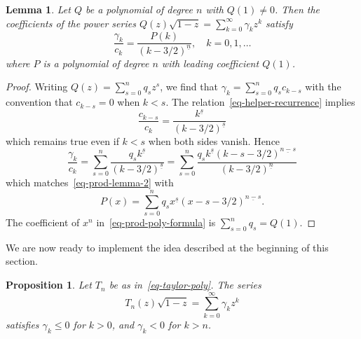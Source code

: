 \documentclass[12pt]{amsart}
\newtheorem{lemma}[theorem]{Lemma}
\newtheorem{proposition}[theorem]{Proposition}
\theoremstyle{definition}
\theoremstyle{remark}
\numberwithin{equation}{section}
\begin{document}
\begin{lemma}\label{lemma-prod-poly} Let $Q$ be a polynomial of degree $n$ with $Q(1)\ne 0$. Then the coefficients of the power series  
$Q(z) \sqrt{1-z} = \sum_{k=0}^\infty \gamma_k z^k$ 
satisfy     
\begin{equation}\label{eq-prod-lemma-2}
\frac{\gamma_k}{c_k} = 
\frac{P(k)}{(k-3/2)^{\underline{n}}},\quad k=0,1,\dots
\end{equation}    
where $P$ is a polynomial of degree $n$ with leading coefficient $Q(1)$. 
\end{lemma}


\begin{proof} Writing $Q(z)=\sum_{s=0}^n q_s z^s$, we find that 
$\gamma_k = \sum_{s=0}^n q_s c_{k-s}$ with the convention that $c_{k-s}=0$ when $k<s$. The relation~\eqref{eq-helper-recurrence} implies 
\[
\frac{c_{k-s}}{c_k} = \frac{k^{\underline{s}}}{(k-3/2)^{\underline{s}}}
\]
which remains true even if $k<s$ when both sides vanish. Hence
\[
\frac{\gamma_k}{c_k} = \sum_{s=0}^n  \frac{q_s k^{\underline{s}}}{(k-3/2)^{\underline{s}}} = 
 \sum_{s=0}^n \frac{ q_s  k^{\underline{s}}(k-s-3/2)^{\underline{n-s}} }{(k-3/2)^{\underline{n}}}
\]
which matches~\eqref{eq-prod-lemma-2} with 
\begin{equation}\label{eq-prod-poly-formula}
P(x) =  \sum_{s=0}^n q_s  x^{\underline{s}}(x-s-3/2)^{\underline{n-s}}.   
\end{equation}
The coefficient of $x^n$ in~\eqref{eq-prod-poly-formula} is $\sum_{s=0}^n q_s = Q(1)$. 
\end{proof}

We are now ready to implement the idea described at the beginning of this section.

\begin{proposition}\label{prop-all-negative} Let $T_n$ be as in~\eqref{eq-taylor-poly}. The series
\begin{equation}\label{eq-prod-1}
T_n(z) \sqrt{1-z} = \sum_{k=0}^\infty \gamma_k z^k  
\end{equation}
satisfies $\gamma_k\le 0$ for $k>0$, and $\gamma_k < 0$ for $k>n$.     
\end{proposition}
\end{document}
